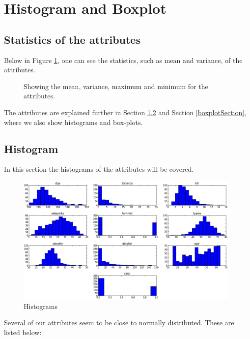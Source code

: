 \section{Histogram and Boxplot}

\subsection{Statistics of the attributes}
Below in Figure \ref{statistics}, one can see the statistics, such as mean and variance, of the attributes.

\begin{figure}[H]

\caption{Showing the mean, variance, maximum and minimum for the attributes.}
\label{statistics}
\end{figure}

The attributes are explained further in Section \ref{histogramSection} and Section \ref{boxplotSection}, where we also show histograms and box-plots.

\subsection{Histogram}
\label{histogramSection}
In this section the histograms of the attributes will be covered.%
\begin{figure}[H]
\centering
\includegraphics[width=11cm, keepaspectratio=true]{pictures/histogram.png}
\vspace{-0.2cm}
\caption{\footnotesize Histograms}
\vspace{-0.5cm}
\label{histogram}
\end{figure}
Several of our attributes seem to be close to normally distributed. These are listed below:
